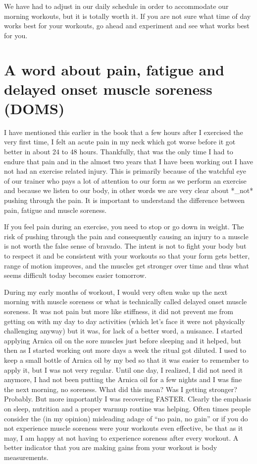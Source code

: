 \documentclass[
  oneside]{book}
\begin{document}
We have had to adjust in our daily schedule in order to accommodate our morning workouts, but it is totally worth it. If you are not sure what time of day works best for your workouts, go ahead and experiment and see what works best for you.

\hypertarget{a-word-about-pain-fatigue-and-delayed-onset-muscle-soreness-doms}{%
\section{A word about pain, fatigue and delayed onset muscle soreness (DOMS)}\label{a-word-about-pain-fatigue-and-delayed-onset-muscle-soreness-doms}}

I have mentioned this earlier in the book that a few hours after I exercised the very first time, I felt an acute pain in my neck which got worse before it got better in about 24 to 48 hours. Thankfully, that was the only time I had to endure that pain and in the almost two years that I have been working out I have not had an exercise related injury. This is primarily because of the watchful eye of our trainer who pays a lot of attention to our form as we perform an exercise and because we listen to our body, in other words we are very clear about *\_not* pushing through the pain. It is important to understand the difference between pain, fatigue and muscle soreness.

If you feel pain during an exercise, you need to stop or go down in weight. The risk of pushing through the pain and consequently causing an injury to a muscle is not worth the false sense of bravado. The intent is not to fight your body but to respect it and be consistent with your workouts so that your form gets better, range of motion improves, and the muscles get stronger over time and thus what seems difficult today becomes easier tomorrow.

During my early months of workout, I would very often wake up the next morning with muscle soreness or what is technically called delayed onset muscle soreness. It was not pain but more like stiffness, it did not prevent me from getting on with my day to day activities (which let's face it were not physically challenging anyway) but it was, for lack of a better word, a nuisance. I started applying Arnica oil on the sore muscles just before sleeping and it helped, but then as I started working out more days a week the ritual got diluted. I used to keep a small bottle of Arnica oil by my bed so that it was easier to remember to apply it, but I was not very regular. Until one day, I realized, I did not need it anymore, I had not been putting the Arnica oil for a few nights and I was fine the next morning, no soreness. What did this mean? Was I getting stronger? Probably. But more importantly I was recovering FASTER. Clearly the emphasis on sleep, nutrition and a proper warmup routine was helping. Often times people consider the (in my opinion) misleading adage of ``no pain, no gain'' or if you do not experience muscle soreness were your workouts even effective, be that as it may, I am happy at not having to experience soreness after every workout. A better indicator that you are making gains from your workout is body measurements.
\end{document}
